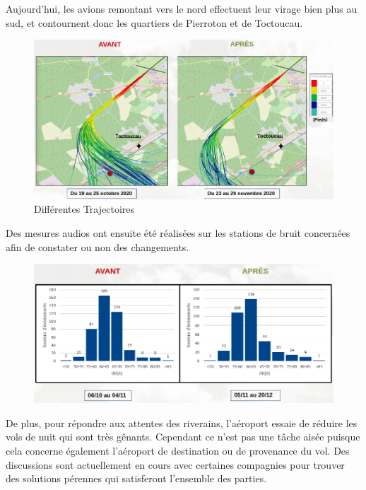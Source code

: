 Aujourd'hui, les avions remontant vers le nord effectuent leur virage bien plus au sud, et contournent donc les quartiers de Pierroton et de Toctoucau.\newline

\begin{figure}[hbt!]
  \centering
  \includegraphics[width=13.5cm]{Images/trajectoires_avant_apres.png}\newline
  \caption{Différentes Trajectoires}
  \label{fig:trajectoires}
\end{figure}

Des mesures audios ont ensuite été réalisées sur les stations de bruit concernées afin de constater ou non des changements.

\begin{figure}[hbt!]
  \centering
  \includegraphics[width=14cm]{Images/bruit_avant_apres.png}\newline
  \label{fig:Mesures audios}
\end{figure}

De plus, pour répondre aux attentes des riverains, l'aéroport essaie de réduire les vols de nuit qui sont très gênants. Cependant ce n'est pas une tâche aisée puisque cela concerne également l'aéroport de destination ou de provenance du vol. Des discussions sont actuellement en cours avec certaines compagnies pour trouver des solutions pérennes qui satisferont l'ensemble des parties.\newline

